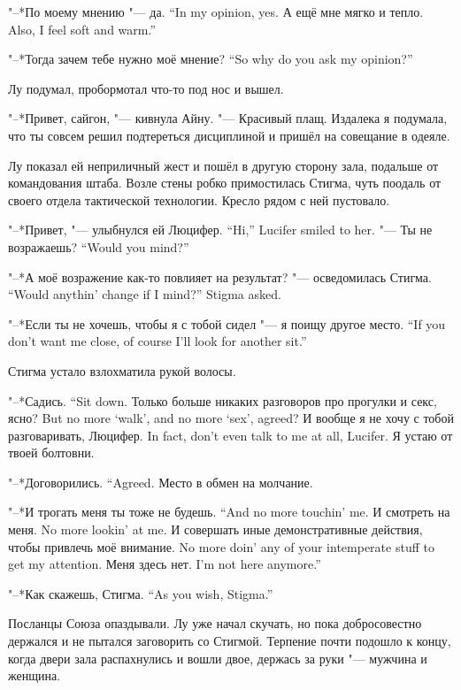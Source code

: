 {"--*По моему мнению "--- да.}
{``In my opinion, yes.}
{А ещё мне мягко и тепло.}
{Also, I feel soft and warm.''}

{"--*Тогда зачем тебе нужно моё мнение?}
{``So why do you ask my opinion?''}

Лу подумал, пробормотал что-то под нос и вышел.

\razd

"--*Привет, сайгон, "--- кивнула Айну.
"--- Красивый плащ.
Издалека я подумала, что ты совсем решил подтереться дисциплиной и пришёл на совещание в одеяле.

Лу показал ей неприличный жест и пошёл в другую сторону зала, подальше от командования штаба.
Возле стены робко примостилась Стигма, чуть поодаль от своего отдела тактической технологии.
Кресло рядом с ней пустовало.

{"--*Привет, "--- улыбнулся ей Люцифер.}
{``Hi,'' Lucifer smiled to her.}
{"--- Ты не возражаешь?}
{``Would you mind?''}

{"--*А моё возражение как-то повлияет на результат? "--- осведомилась Стигма.}
{``Would anythin' change if I mind?'' Stigma asked.}

{"--*Если ты не хочешь, чтобы я с тобой сидел "--- я поищу другое место.}
{``If you don't want me close, of course I'll look for another sit.''}

Стигма устало взлохматила рукой волосы.

{"--*Садись.}
{``Sit down.}
{Только больше никаких разговоров про прогулки и секс, ясно?}
{But no more `walk', and no more `sex', agreed?}
{И вообще я не хочу с тобой разговаривать, Люцифер.}
{In fact, don't even talk to me at all, Lucifer.}
Я устаю от твоей болтовни.

{"--*Договорились.}
{``Agreed.}
Место в обмен на молчание.

{"--*И трогать меня ты тоже не будешь.}
{``And no more touchin' me.}
{И смотреть на меня.}
{No more lookin' at me.}
{И совершать иные демонстративные действия, чтобы привлечь моё внимание.}
{No more doin' any of your intemperate stuff to get my attention.}
{Меня здесь нет.}
{I'm not here anymore.''}

{"--*Как скажешь, Стигма.}
{``As you wish, Stigma.''}

Посланцы Союза опаздывали.
Лу уже начал скучать, но пока добросовестно держался и не пытался заговорить со Стигмой.
Терпение почти подошло к концу, когда двери зала распахнулись и вошли двое, держась за руки "--- мужчина и женщина.

